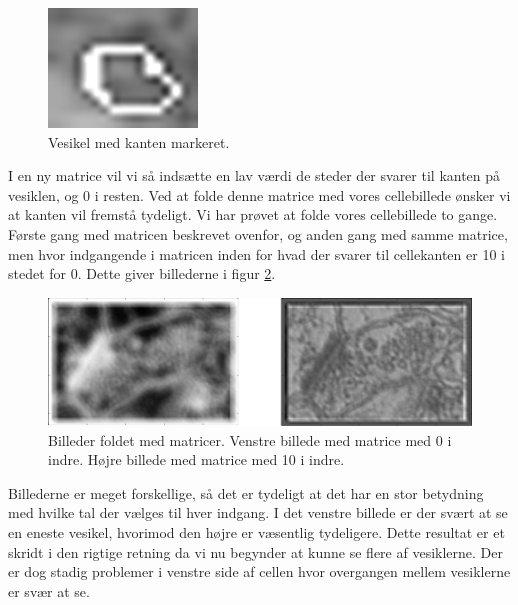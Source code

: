 \begin{figure}[H]
	\centering
	\includegraphics[scale=0.8]{files/premethod/img/vesikel_edge.png}
	\caption{Vesikel med kanten markeret.\label{fig:premethod_vesedge}}
\end{figure}

I en ny matrice vil vi så indsætte en lav værdi de steder der svarer til kanten på vesiklen, og 0 i resten. Ved at folde denne matrice med vores cellebillede ønsker vi at kanten vil fremstå tydeligt. Vi har prøvet at folde vores cellebillede to gange. Første gang med matricen beskrevet ovenfor, og anden gang med samme matrice, men hvor indgangende i matricen inden for hvad der svarer til cellekanten er 10 i stedet for 0. Dette giver billederne i figur \ref{fig:premethod_vesEdgeConv}.

\begin{figure}[H]
		\centering
		\includegraphics[scale=0.35]{files/premethod/img/convolve_edge.png}
	\caption{Billeder foldet med matricer. Venstre billede med matrice med 0 i indre. Højre billede med matrice med 10 i indre.\label{fig:premethod_vesEdgeConv}}
\end{figure}

Billederne er meget forskellige, så det er tydeligt at det har en stor betydning med hvilke tal der vælges til hver indgang. I det venstre billede er der svært at se en eneste vesikel, hvorimod den højre er væsentlig tydeligere. Dette resultat er et skridt i den rigtige retning da vi nu begynder at kunne se flere af vesiklerne. Der er dog stadig problemer i venstre side af cellen hvor overgangen mellem vesiklerne er svær at se.

